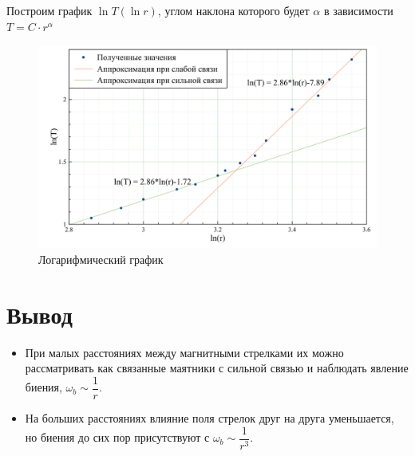 \documentclass{letask}
\begin{document}
\begin{table}[H]
\centering
{}
\caption{Данные эксперимента}
\end{table}

Построим график $\ln T(\ln r)$, углом наклона которого будет $\alpha$ в зависимости $T = C \cdot r^{\alpha}$

\begin{figure}[H]
\centering
\includegraphics[width = 0.8 \tw]{Logarithmic}
\caption{Логарифмический график}
\end{figure}

\section{Вывод}  

\begin{itemize}
\item При малых расстояниях между магнитными стрелками их можно рассматривать как связанные маятники с сильной связью и наблюдать явление биения, $\omega_b \sim \dfrac{1}{r}$.

\item На больших расстояниях влияние поля стрелок друг на друга уменьшается, но биения до сих пор присутствуют с $\omega_b \sim \dfrac{1}{r^3}$.
\end{itemize}
\end{document}
